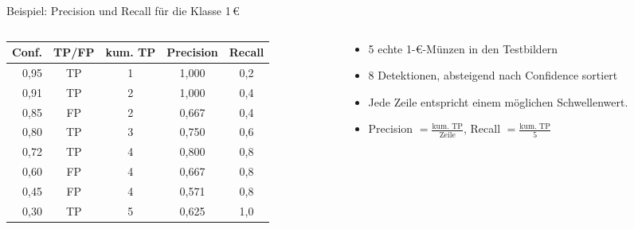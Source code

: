 \begin{frame}{Beispiel: Precision und Recall für die Klasse 1\,€}
\footnotesize
\begin{columns}
\begin{column}{0.60\textwidth}
\centering
\begin{tabular}{rcccc}
\toprule
\textbf{Conf.} & \textbf{TP/FP} & \textbf{kum. TP} & \textbf{Precision} & \textbf{Recall} \\
\midrule
0,95 & TP & 1 & 1,000 & 0,2 \\
0,91 & TP & 2 & 1,000 & 0,4 \\
0,85 & FP & 2 & 0,667 & 0,4 \\
0,80 & TP & 3 & 0,750 & 0,6 \\
0,72 & TP & 4 & 0,800 & 0,8 \\
0,60 & FP & 4 & 0,667 & 0,8 \\
0,45 & FP & 4 & 0,571 & 0,8 \\
0,30 & TP & 5 & 0,625 & 1,0 \\
\bottomrule
\end{tabular}
\end{column}
\begin{column}{0.35\textwidth}
\begin{itemize}
  \item 5 echte 1-€-Münzen in den Testbildern
  \item 8 Detektionen, absteigend nach Confidence sortiert
  \item Jede Zeile entspricht einem möglichen Schwellenwert.
  \item Precision $= \frac{\text{kum. TP}}{\text{Zeile}}$, Recall $= \frac{\text{kum. TP}}{5}$
\end{itemize}
\end{column}
\end{columns}
\end{frame}

